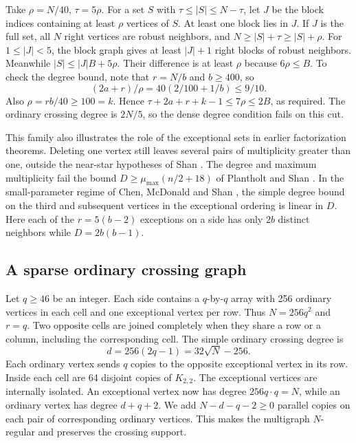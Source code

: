 \documentclass[11pt]{article}
\begin{document}
Take \(\rho=N/40\), \(\tau=5\rho\). For a set \(S\) with \(\tau\le|S|\le N-\tau\), let \(J\) be the block indices containing at least \(\rho\) vertices of \(S\). At least one block lies in \(J\). If \(J\) is the full set, all \(N\) right vertices are robust neighbors, and \(N\ge |S|+\tau\ge |S|+\rho\). For \(1\le |J|<5\), the block graph gives at least \(|J|+1\) right blocks of robust neighbors. Meanwhile \(|S|\le |J|B+5\rho\). Their difference is at least \(\rho\) because \(6\rho\le B\). To check the degree bound, note that \(r=N/b\) and \(b\ge400\), so
\[
 (2a+r)/\rho=40(2/100+1/b)\le 9/10.
\]
Also \(\rho=rb/40\ge100=k\). Hence \(\tau+2a+r+k-1\le7\rho\le 2B\), as required. The ordinary crossing degree is \(2N/5\), so the dense degree condition fails on this cut.

This family also illustrates the role of the exceptional sets in earlier factorization theorems. Deleting one vertex still leaves several pairs of multiplicity greater than one, outside the near-star hypotheses of Shan \cite[Theorem~3.1]{Shan}. The degree and maximum multiplicity fail the bound \(D\ge\mu_{\max}(n/2+18)\) of Plantholt and Shan \cite[Theorem~1.6]{PlantholtShan}. In the small-parameter regime of Chen, McDonald and Shan \cite[Theorem~4.2]{CMS}, the simple degree bound on the third and subsequent vertices in the exceptional ordering is linear in \(D\). Here each of the \(r=5(b-2)\) exceptions on a side has only \(2b\) distinct neighbors while \(D=2b(b-1)\).

\subsection{A sparse ordinary crossing graph}\label{sec:grid}

Let \(q\ge46\) be an integer. Each side contains a \(q\)-by-\(q\) array with 256 ordinary vertices in each cell and one exceptional vertex per row. Thus \(N=256q^2\) and \(r=q\). Two opposite cells are joined completely when they share a row or a column, including the corresponding cell. The simple ordinary crossing degree is
\[
 d=256(2q-1)=32\sqrt N-256 .
\]
Each ordinary vertex sends \(q\) copies to the opposite exceptional vertex in its row. Inside each cell are 64 disjoint copies of \(K_{2,2}\). The exceptional vertices are internally isolated. An exceptional vertex now has degree \(256q\cdot q=N\), while an ordinary vertex has degree \(d+q+2\). We add \(N-d-q-2\ge0\) parallel copies on each pair of corresponding ordinary vertices. This makes the multigraph \(N\)-regular and preserves the crossing support.
\end{document}
